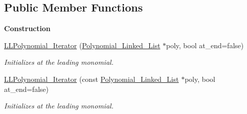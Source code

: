 \subsection*{Public Member Functions}
\begin{Indent}\textbf{ Construction}\par
\begin{DoxyCompactItemize}
\item 
\mbox{\label{class_l_l_polynomial___iterator_aef49d7f26dd804b0ab0affbe1567fd07}} 
\hyperlink{class_l_l_polynomial___iterator_aef49d7f26dd804b0ab0affbe1567fd07}{L\+L\+Polynomial\+\_\+\+Iterator} (\hyperlink{class_polynomial___linked___list}{Polynomial\+\_\+\+Linked\+\_\+\+List} $\ast$poly, bool at\+\_\+end=false)
\begin{DoxyCompactList}\small\item\em Initializes at the leading monomial. \end{DoxyCompactList}\item 
\mbox{\label{class_l_l_polynomial___iterator_a957ab5441b10a681f647fe4417b2d373}} 
\hyperlink{class_l_l_polynomial___iterator_a957ab5441b10a681f647fe4417b2d373}{L\+L\+Polynomial\+\_\+\+Iterator} (const \hyperlink{class_polynomial___linked___list}{Polynomial\+\_\+\+Linked\+\_\+\+List} $\ast$poly, bool at\+\_\+end=false)
\begin{DoxyCompactList}\small\item\em Initializes at the leading monomial. \end{DoxyCompactList}\end{DoxyCompactItemize}
\end{Indent}
